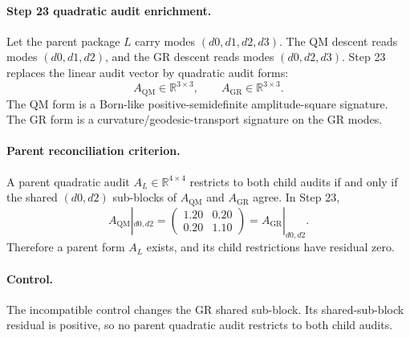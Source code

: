 \paragraph{Step 23 quadratic audit enrichment.}
Let the parent package \(L\) carry modes
\((d0,d1,d2,d3)\).  The QM descent reads modes
\((d0,d1,d2)\), and the GR descent reads modes \((d0,d2,d3)\).
Step 23 replaces the linear audit vector by quadratic audit forms:
\[
A_{\mathrm{QM}}\in\mathbb R^{3\times 3},\qquad
A_{\mathrm{GR}}\in\mathbb R^{3\times 3}.
\]
The QM form is a Born-like positive-semidefinite amplitude-square
signature.  The GR form is a curvature/geodesic-transport signature
on the GR modes.

\paragraph{Parent reconciliation criterion.}
A parent quadratic audit \(A_L\in\mathbb R^{4\times4}\) restricts to
both child audits if and only if the shared \((d0,d2)\) sub-blocks of
\(A_{\mathrm{QM}}\) and \(A_{\mathrm{GR}}\) agree.  In Step 23,
\[
A_{\mathrm{QM}}|_{d0,d2}
=
\begin{pmatrix}1.20&0.20\\0.20&1.10\end{pmatrix}
=
A_{\mathrm{GR}}|_{d0,d2}.
\]
Therefore a parent form \(A_L\) exists, and its child restrictions
have residual zero.

\paragraph{Control.}
The incompatible control changes the GR shared sub-block.  Its
shared-sub-block residual is positive, so no parent quadratic audit
restricts to both child audits.
